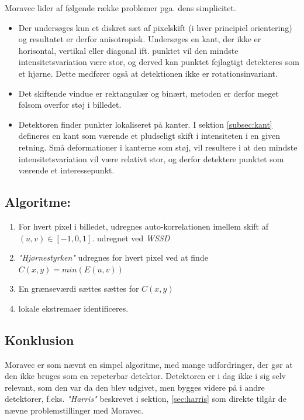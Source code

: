Moravec lider af følgende række problemer pga. dens simplicitet. 
\begin{itemize}
\item{ Der undersøges kun et diskret sæt af pixelskift (i hver principiel orientering) og resultatet er derfor anisotropisk. Undersøges en kant, der ikke er horisontal, vertikal eller diagonal ift. punktet vil den mindste intensitetsvariation være stor, og derved kan punktet fejlagtigt detekteres som et hjørne. Dette medfører også at detektionen ikke er rotationsinvariant.}
\item{Det skiftende vindue er rektangulær og binært, metoden er derfor meget følsom overfor støj i billedet.}
\item{Detektoren finder punkter lokaliseret på kanter. I sektion \ref{subsec:kant} defineres en kant som værende et pludseligt skift i intensiteten i en given retning. Små deformationer i kanterne som støj, vil resultere i at den mindste intensitetsvariation vil være relativt stor, og derfor detektere punktet som værende et interessepunkt.}
\end{itemize}
\subsection*{Algoritme:}
\begin{enumerate}
\item{For hvert pixel i billedet, udregnes auto-korrelationen imellem skift af $(u,v) \in [-1,0,1]$. udregnet ved \textit{WSSD} }
\item{\textit{"Hjørnestyrken"} udregnes for hvert pixel ved at finde $C(x,y)=min(E(u,v))$ }
\item{ En grænseværdi sættes sættes for $C(x,y)$}
\item{lokale ekstremaer identificeres. }
\end{enumerate}
\subsection*{Konklusion}
Moravec er som nævnt en simpel algoritme, med mange udfordringer, der gør at den ikke bruges som en repeterbar detektor. Detektoren er i dag ikke i sig selv relevant, som den var da den blev udgivet, men bygges videre på i andre detektorer, f.eks. \textit{"Harris"} beskrevet i sektion, \ref{sec:harris} som direkte tilgår de nævne problemstillinger med Moravec.